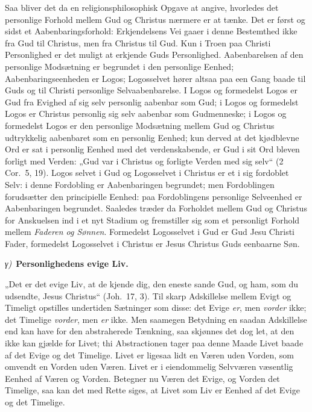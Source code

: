 \documentclass[12pt]{book}
\newcommand{\greekrun}[2]{%
  \medskip\begin{center}{\itshape #1)}\ {\bfseries #2}\end{center}\medskip}
\begin{document}
Saa bliver det da en religionsphilosophisk Opgave at angive,
hvorledes det personlige Forhold mellem Gud og Christus nærmere er
at tænke. Det er først og sidst et Aabenbaringsforhold: Erkjendelsens
Vei gaaer i denne Bestemthed ikke fra Gud til Christus, men fra
Christus til Gud. Kun i Troen paa Christi Personlighed er det
muligt at erkjende Guds Personlighed. Aabenbarelsen af den
personlige Modsætning er begrundet i den personlige Eenhed;
Aabenbaringseenheden er Logos; Logosselvet hører altsaa paa een Gang
baade til Guds og til Christi personlige Selvaabenbarelse. I Logos
og formedelst Logos er Gud fra Evighed af sig selv personlig
aabenbar som Gud; i Logos og formedelst Logos er Christus personlig
sig selv aabenbar som Gudmenneske; i Logos og formedelst Logos er
den personlige Modsætning mellem Gud og Christus udtrykkelig
aabenbaret som en personlig Eenhed; kun derved at det kjødblevne Ord
er sat i personlig Eenhed med det verdenskabende, er Gud i sit Ord
bleven forligt med Verden: „Gud var i Christus og forligte Verden
med sig selv“ (2 Cor.\ 5, 19). Logos selvet i Gud og Logosselvet i
Christus er et i sig fordoblet Selv:
i denne Fordobling er
Aabenbaringen begrundet; men Fordoblingen forudsætter den
principielle Eenhed: paa Fordoblingens personlige Selveenhed er
Aabenbaringen begrundet. Saaledes træder da Forholdet mellem Gud og
Christus for Anskuelsen ind i et nyt Stadium og fremstiller sig som
et personligt Forhold mellem \emph{Faderen og Sønnen}. Formedelst
Logosselvet i Gud er Gud Jesu Christi Fader, formedelst Logosselvet
i Christus er Jesus Christus Guds eenbaarne Søn.

\greekrun{γ}{Personlighedens evige Liv.}

„Det er det evige Liv, at de kjende dig, den eneste sande Gud, og
ham, som du udsendte, Jesus Christus“ (Joh.\ 17, 3). Til skarp
Adskillelse mellem Evigt og Timeligt opstilles undertiden Sætninger
som disse: det Evige \emph{er}, men \emph{vorder} ikke; det Timelige
\emph{vorder}, men \emph{er} ikke. Men saamegen Betydning en saadan
Adskillelse end kan have for den abstraherede Tænkning, saa skjønnes
det dog let, at den ikke kan gjælde for Livet; thi Abstractionen
tager paa denne Maade Livet baade af det
Evige og det Timelige. Livet er ligesaa lidt en Væren uden Vorden,
som omvendt en Vorden uden Væren. Livet er i eiendommelig Selvværen
væsentlig Eenhed af Væren og Vorden. Betegner nu Væren det Evige, og
Vorden det Timelige, saa kan det med Rette siges, at Livet som Liv
er Eenhed af det Evige og det Timelige.
\end{document}
